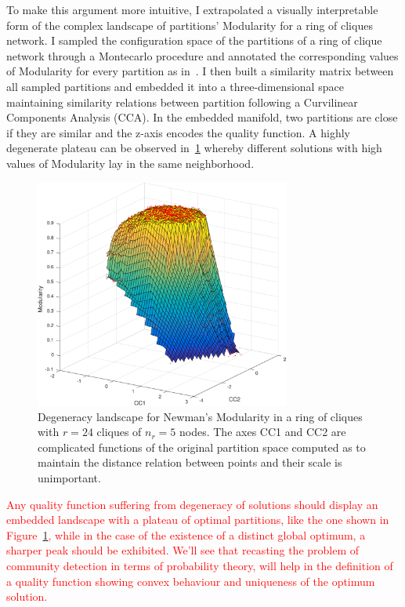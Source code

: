 To make this argument more intuitive, I extrapolated a visually interpretable form of the complex landscape of partitions' Modularity for a ring of cliques network. I sampled the configuration space of the partitions of a ring of clique network through a Montecarlo procedure and annotated the corresponding values of Modularity for every partition as in~\cite{good2009}.
I then built a similarity matrix between all sampled partitions and embedded it into a three-dimensional space maintaining similarity relations between partition following a Curvilinear Components Analysis (CCA).
In the embedded manifold, two partitions are close if they are similar and the z-axis encodes the quality function.
A highly degenerate plateau can be observed in~\ref{fig:degeneracylandscape} whereby different solutions with high values of Modularity lay in the same neighborhood.

\begin{figure}[htb!]
\centering
\includegraphics[width=0.75\textwidth]{images/degeneracy_modularity.pdf}
\caption{Degeneracy landscape for Newman's Modularity in a ring of cliques with $r=24$ cliques of $n_r=5$ nodes. The axes CC1 and CC2 are complicated functions of the original partition space computed as to maintain the distance relation between points and their scale is unimportant.}
\label{fig:degeneracylandscape}
\end{figure}

\textcolor{red}{Any quality function suffering from degeneracy of solutions should display an embedded landscape with a plateau of optimal partitions, like the one shown in Figure~\ref{fig:degeneracylandscape}, while in the case of the existence of a distinct global optimum, a sharper peak should be exhibited.
We'll see that recasting the problem of community detection in terms of probability theory, will help in the definition of a quality function showing convex behaviour and uniqueness of the optimum solution.}

